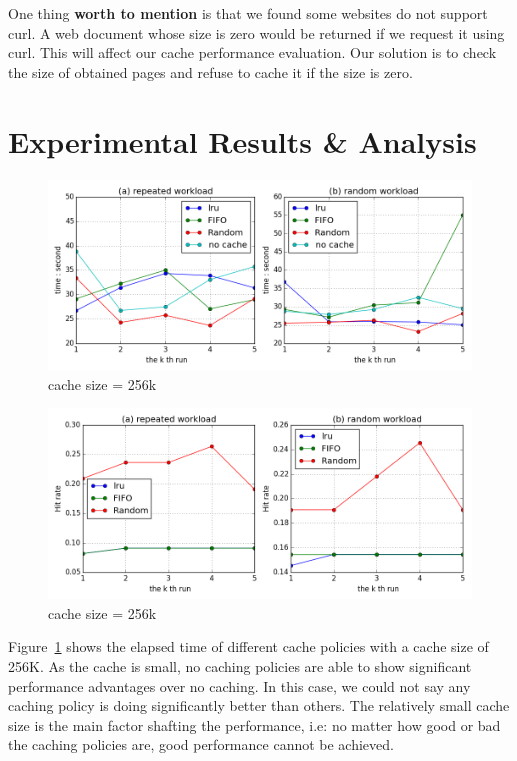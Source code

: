 \documentclass[paper=a4, fontsize=11pt]{scrartcl} %
\numberwithin{equation}{section} %
\numberwithin{figure}{section} %
\numberwithin{table}{section} %
\begin{document}
\vspace{1em}

One thing \textbf{worth to mention} is that we found some websites do not support curl. A web document whose size is zero would be returned if we request it using curl. This will affect our cache performance evaluation. Our solution is to check the size of obtained pages and refuse to cache it if the size is zero. 

\section{Experimental Results \& Analysis}

\begin{figure}[h]
  \centering
  \includegraphics[width=\textwidth]{../data/time256k}
  \caption{cache size = 256k}
  \label{fig:time256k}
\end{figure}
\begin{figure}[h]
  \centering
  \includegraphics[width=\textwidth]{../data/hit256k}
  \caption{cache size = 256k}
  \label{fig:hit256k}
\end{figure}

Figure~\ref{fig:time256k} shows the elapsed time of different cache policies with a cache size of 256K. As the cache is small, no caching policies are able to show significant performance advantages over no caching. In this case, we could not say any caching policy is doing significantly better than others. The relatively small cache size is the main factor shafting the performance, i.e: no matter how good or bad the caching policies are, good performance cannot be achieved.
\end{document}
